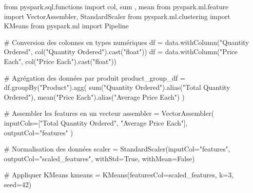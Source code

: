 \documentclass[
  letterpaper,
  DIV=11,
  numbers=noendperiod]{scrartcl}
\newenvironment{Shaded}{\begin{snugshade}}{\end{snugshade}}
\newcommand{\BuiltInTok}[1]{\textcolor[rgb]{0.00,0.23,0.31}{#1}}
\newcommand{\CommentTok}[1]{\textcolor[rgb]{0.37,0.37,0.37}{#1}}
\newcommand{\DecValTok}[1]{\textcolor[rgb]{0.68,0.00,0.00}{#1}}
\newcommand{\ImportTok}[1]{\textcolor[rgb]{0.00,0.46,0.62}{#1}}
\newcommand{\NormalTok}[1]{\textcolor[rgb]{0.00,0.23,0.31}{#1}}
\newcommand{\OperatorTok}[1]{\textcolor[rgb]{0.37,0.37,0.37}{#1}}
\newcommand{\StringTok}[1]{\textcolor[rgb]{0.13,0.47,0.30}{#1}}
\newcommand{\VariableTok}[1]{\textcolor[rgb]{0.07,0.07,0.07}{#1}}
\begin{document}
\begin{Shaded}
\begin{Highlighting}[]
\ImportTok{from}\NormalTok{ pyspark.sql.functions }\ImportTok{import}\NormalTok{ col, }\BuiltInTok{sum}\NormalTok{ , mean}
\ImportTok{from}\NormalTok{ pyspark.ml.feature }\ImportTok{import}\NormalTok{ VectorAssembler, StandardScaler}
\ImportTok{from}\NormalTok{ pyspark.ml.clustering }\ImportTok{import}\NormalTok{ KMeans}
\ImportTok{from}\NormalTok{ pyspark.ml }\ImportTok{import}\NormalTok{ Pipeline}



\CommentTok{\# Conversion des colonnes en types numériques}
\NormalTok{df }\OperatorTok{=}\NormalTok{ data.withColumn(}\StringTok{"Quantity Ordered"}\NormalTok{, col(}\StringTok{"Quantity Ordered"}\NormalTok{).cast(}\StringTok{"float"}\NormalTok{))}
\NormalTok{df }\OperatorTok{=}\NormalTok{ data.withColumn(}\StringTok{"Price Each"}\NormalTok{, col(}\StringTok{"Price Each"}\NormalTok{).cast(}\StringTok{"float"}\NormalTok{))}

\CommentTok{\# Agrégation des données par produit}
\NormalTok{product\_group\_df }\OperatorTok{=}\NormalTok{ df.groupBy(}\StringTok{"Product"}\NormalTok{).agg(}
    \BuiltInTok{sum}\NormalTok{(}\StringTok{"Quantity Ordered"}\NormalTok{).alias(}\StringTok{"Total Quantity Ordered"}\NormalTok{),}
\NormalTok{    mean(}\StringTok{"Price Each"}\NormalTok{).alias(}\StringTok{"Average Price Each"}\NormalTok{)}
\NormalTok{)}


\CommentTok{\# Assembler les features en un vecteur}
\NormalTok{assembler }\OperatorTok{=}\NormalTok{ VectorAssembler(}
\NormalTok{    inputCols}\OperatorTok{=}\NormalTok{[}\StringTok{"Total Quantity Ordered"}\NormalTok{, }\StringTok{"Average Price Each"}\NormalTok{],}
\NormalTok{    outputCol}\OperatorTok{=}\StringTok{"features"}
\NormalTok{)}

\CommentTok{\# Normalisation des données}
\NormalTok{scaler }\OperatorTok{=}\NormalTok{ StandardScaler(inputCol}\OperatorTok{=}\StringTok{"features"}\NormalTok{, outputCol}\OperatorTok{=}\StringTok{"scaled\_features"}\NormalTok{, withStd}\OperatorTok{=}\VariableTok{True}\NormalTok{, withMean}\OperatorTok{=}\VariableTok{False}\NormalTok{)}

\CommentTok{\# Appliquer KMeans}
\NormalTok{kmeans }\OperatorTok{=}\NormalTok{ KMeans(featuresCol}\OperatorTok{=}\StringTok{\textquotesingle{}scaled\_features\textquotesingle{}}\NormalTok{, k}\OperatorTok{=}\DecValTok{3}\NormalTok{, seed}\OperatorTok{=}\DecValTok{42}\NormalTok{)}


\end{Highlighting}
\end{Shaded}
\end{document}
